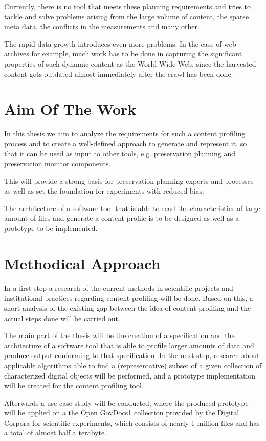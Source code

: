 Currently, there is no tool that meets these planning requirements and tries to tackle and solve problems arising from the large volume of content, the sparse meta data, the conflicts in the measurements and many other.

The rapid data growth introduces even more problems. In the case of web archives for example, much work has to be done in capturing the significant properties of such dynamic content as the World Wide Web, since the harvested content gets outdated almost immediately after the crawl has been done.

\section{Aim Of The Work}
In this thesis we aim to analyze the requirements for such a content profiling process and to create a well-defined approach to generate and represent it, so that it can be used as input to other tools, e.g. preservation planning and preservation monitor components.

This will provide a strong basis for preservation planning experts and processes as well as set the foundation for experiments with reduced bias.

The architecture of a software tool that is able to read the characteristics of large amount of files and generate a content profile is to be designed as well as a prototype to be implemented. 

\section{Methodical Approach}
In a first step a research of the current methods in scientific projects and institutional practices regarding content profiling will be done. Based on this, a short analysis of the existing gap between the idea of content profiling and the actual steps done will be carried out. 

The main part of the thesis will be the creation of a specification and the architecture of a software tool that is able to profile larger amounts of data and produce output conforming to that specification. In the next step, research about applicable algorithms able to find a (representative) subset of a given collection of characterized digital objects will be performed, and a prototype implementation will be created for the content profiling tool. 

Afterwards a use case study will be conducted, where the produced prototype will be applied on a the Open GovDocs1 collection provided by the Digital Corpora for scientific experiments, which consists of nearly 1 million files and has a total of almost half a terabyte. 

